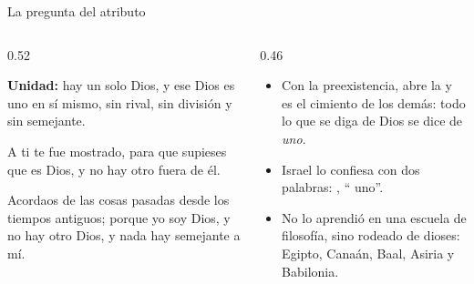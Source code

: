 \begin{frame}{La pregunta del atributo}
\begin{columns}[c,onlytextwidth]
\begin{column}{0.52\textwidth}
\begin{tcolorbox}[colback=papiro,colframe=azul,boxrule=1pt,arc=3pt]
\small\textbf{Unidad:} hay un solo Dios, y ese Dios es uno en sí mismo, sin rival, sin división y sin semejante.
\end{tcolorbox}
\begin{cita}A ti te fue mostrado, para que supieses que \SENOR{} es Dios, y no hay otro fuera de él.\end{cita}
\begin{cita}Acordaos de las cosas pasadas desde los tiempos antiguos; porque yo soy Dios, y no hay otro Dios, y nada hay semejante a mí.\end{cita}
\end{column}
\begin{column}{0.46\textwidth}\small
\begin{itemize}
\item Con la preexistencia, abre la  y es el cimiento de los demás: todo lo que se diga de Dios se dice de \emph{uno}.
\item Israel lo confiesa con dos palabras: , ``\SENOR{} uno''.
\item No lo aprendió en una escuela de filosofía, sino rodeado de dioses: Egipto, Canaán, Baal, Asiria y Babilonia.
\end{itemize}
\end{column}
\end{columns}
\end{frame}

